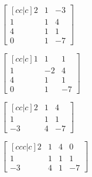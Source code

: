 \documentclass{article}
\begin{document}
\begin{readinessAssuranceTest}
\begin{multicols}{4}
\begin{readinessAssuranceTestChoices}
\item \(
      \begin{bmatrix}[cc|c]
        2 & 1 & -3 \\
        1 & 1 & 4 \\
        4 & 1 & 1 \\
        0 & 1 & -7
      \end{bmatrix}
    \)
\item \(
      \begin{bmatrix}[cc|c]
        1 & 1 & 1 \\
        1 & -2 & 4 \\
        4 & 1 & 1 \\
        0 & 1 & -7
      \end{bmatrix}
    \)
\item \(
      \begin{bmatrix}[cc|c]
        2 & 1 & 4\\
        1 & 1 & 1 \\
        -3 & 4 & -7
      \end{bmatrix}
    \)
\item \(
      \begin{bmatrix}[ccc|c]
        2 & 1 & 4 & 0 \\
        1 & 1 & 1 & 1 \\
        -3 & 4 & 1 & -7
      \end{bmatrix}
    \) %

\end{readinessAssuranceTestChoices}
\end{multicols}




\end{readinessAssuranceTest}
\end{document}
